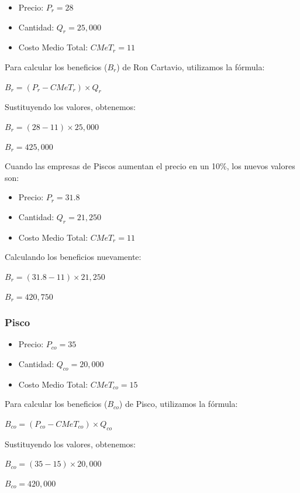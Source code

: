 \documentclass[
  a4paper,
]{article}
\providecommand{\tightlist}{%
  \setlength{\itemsep}{0pt}\setlength{\parskip}{0pt}}\usepackage{longtable,booktabs,array}
\theoremstyle{definition}
\theoremstyle{remark}
\begin{document}
\begin{itemize}
\tightlist
\item
  Precio: \(P_r = 28\)
\item
  Cantidad: \(Q_r = 25,000\)
\item
  Costo Medio Total: \(CMeT_r = 11\)
\end{itemize}

Para calcular los beneficios (\(B_r\)) de Ron Cartavio, utilizamos la
fórmula:

\(B_r = (P_r - CMeT_r) \times Q_r\)

Sustituyendo los valores, obtenemos:

\(B_r = (28 - 11) \times 25,000\)

\(B_r = 425,000\)

Cuando las empresas de Piscos aumentan el precio en un 10\%, los nuevos
valores son:

\begin{itemize}
\tightlist
\item
  Precio: \(P_r = 31.8\)
\item
  Cantidad: \(Q_r = 21,250\)
\item
  Costo Medio Total: \(CMeT_r = 11\)
\end{itemize}

Calculando los beneficios nuevamente:

\(B_r = (31.8 - 11) \times 21,250\)

\(B_r = 420,750\)

\hypertarget{pisco}{%
\subsubsection{Pisco}\label{pisco}}

\begin{itemize}
\tightlist
\item
  Precio: \(P_{co} = 35\)
\item
  Cantidad: \(Q_{co} = 20,000\)
\item
  Costo Medio Total: \(CMeT_{co} = 15\)
\end{itemize}

Para calcular los beneficios (\(B_{co}\)) de Pisco, utilizamos la
fórmula:

\(B_{co} = (P_{co} - CMeT_{co}) \times Q_{co}\)

Sustituyendo los valores, obtenemos:

\(B_{co} = (35 - 15) \times 20,000\)

\(B_{co} = 420,000\)
\end{document}
